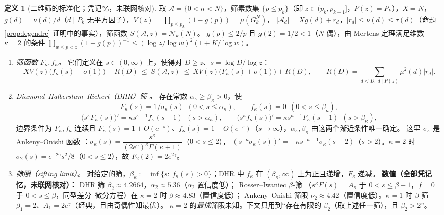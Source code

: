 \documentclass[11pt,a4paper]{article}
\newcommand{\Haar}{\mu}
\newcommand{\Cnt}{\mathcal N}          %
\theoremstyle{plain}
\theoremstyle{definition}
\newtheorem{defn}[prop]{定义}
\begin{document}
\begin{CJK}{UTF8}{gbsn}
\begin{defn}[二维筛的标准化；凭记忆，未联网核对]\label{defn:sieve}
取 $\mathcal A=\{0<n<N\}$，筛素数集 $\{p\le p_k\}$（即 $z\in(p_k,p_{k+1}]$，$P(z)=P_k$），$X=N$，
$g(d)=\nu(d)/d$（$d\mid P_k$ 无平方因子），$V(z)=\prod_{p\le p_k}(1-g(p))=\Haar(G_k^N)$，
$|\mathcal A_d|=Xg(d)+r_d$，$|r_d|\le\nu(d)\le\tau(d)$（命题 \ref{prop:legendre} 证明中的事实），筛函数 $S(\mathcal A,z)=\Cnt_k(N)$。
$g(p)\le2/p$ 且 $g(2)=1/2<1$（$N$ 偶），由 Mertens 定理满足维数 $\kappa=2$ 的条件
$\prod_{w\le p<z}(1-g(p))^{-1}\le(\log z/\log w)^{2}(1+K/\log w)$。
\begin{enumerate}[label=(\roman*)]
\item \emph{筛函数 $F_\kappa,f_\kappa$。} 它们定义在 $s\in(0,\infty)$ 上，使得对 $D\ge z$、$s=\log D/\log z$：
\[
X V(z)\bigl(f_\kappa(s)-o(1)\bigr)-R(D)\ \le\ S(\mathcal A,z)\ \le\ XV(z)\bigl(F_\kappa(s)+o(1)\bigr)+R(D),\qquad
R(D)=\sum_{d<D,\ d\mid P(z)}\mu^2(d)|r_d| .
\]
\item \emph{Diamond--Halberstam--Richert（DHR）筛 \cite{DHR88,DH08}。} 存在常数 $\alpha_\kappa\ge\beta_\kappa>0$，使
\[
F_\kappa(s)=1/\sigma_\kappa(s)\ \ (0<s\le\alpha_\kappa),\qquad f_\kappa(s)=0\ \ (0<s\le\beta_\kappa),
\]
\[
\bigl(s^\kappa F_\kappa(s)\bigr)'=\kappa s^{\kappa-1}f_\kappa(s-1)\ \ (s>\alpha_\kappa),\qquad
\bigl(s^\kappa f_\kappa(s)\bigr)'=\kappa s^{\kappa-1}F_\kappa(s-1)\ \ (s>\beta_\kappa),
\]
边界条件为 $F_\kappa,f_\kappa$ 连续且 $F_\kappa(s)=1+O(e^{-s})$、$f_\kappa(s)=1+O(e^{-s})$（$s\to\infty$），$\alpha_\kappa,\beta_\kappa$ 由这两个渐近条件唯一确定。
这里 $\sigma_\kappa$ 是 Ankeny--Onishi 函数 \cite{AO65}：$\sigma_\kappa(s)=\dfrac{s^\kappa}{(2e^{\gamma})^\kappa\Gamma(\kappa+1)}$（$0<s\le2$），
$(s^{-\kappa}\sigma_\kappa(s))'=-\kappa s^{-\kappa-1}\sigma_\kappa(s-2)$（$s>2$）。$\kappa=2$ 时 $\sigma_2(s)=e^{-2\gamma}s^2/8$（$0<s\le2$），故 $F_2(2)=2e^{2\gamma}$。
\item \emph{筛限（sifting limit）。} 对给定的筛，$\beta_\kappa:=\inf\{s:\ f_\kappa(s)>0\}$；DHR 中 $f_\kappa$ 在 $(\beta_\kappa,\infty)$ 上为正且递增，$F_\kappa$ 递减。
\textbf{数值（全部凭记忆，未联网核对）：}
DHR 筛 $\beta_2\approx4.2664$，$\alpha_2\approx5.36$（$\alpha_2$ 置信度低）；
Rosser--Iwaniec $\beta$-筛 \cite{Iwa80,FI10}（$s^\kappa F(s)=A_\kappa$ 于 $0<s\le\beta+1$，$f=0$ 于 $0<s\le\beta$，同型差分--微分方程）在 $\kappa=2$ 时 $\beta\approx4.83$（置信度低）；
Ankeny--Onishi 筛限 $\nu_2\approx4.42$（置信度低）。$\kappa=1$ 时 $\beta$-筛 $\beta_1=2$、$A_1=2e^\gamma$（经典，且由奇偶性知最优）。
$\kappa=2$ 的\emph{最优}筛限未知。下文只用到“存在有限的 $\beta_2$（取上述任一筛），且 $\beta_2>2$”。
\end{enumerate}
\end{defn}


\end{CJK}
\end{document}
